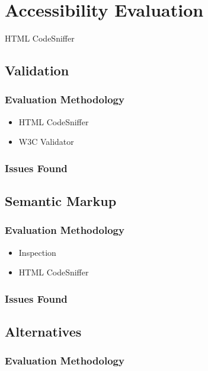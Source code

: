 \section{Accessibility Evaluation}


HTML CodeSniffer

\subsection{Validation}

\subsubsection{Evaluation Methodology}

\begin{itemize}
\item HTML CodeSniffer
\item W3C Validator
\end{itemize}

\subsubsection{Issues Found}

\subsection{Semantic Markup}

\subsubsection{Evaluation Methodology}

\begin{itemize}
\item Inspection
\item HTML CodeSniffer
\end{itemize}

\subsubsection{Issues Found}

\subsection{Alternatives}

\subsubsection{Evaluation Methodology}

